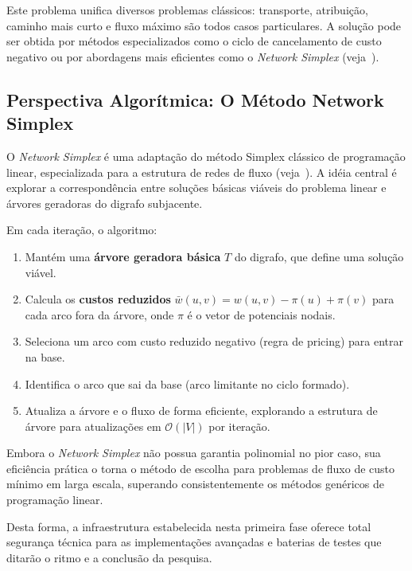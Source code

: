 \documentclass[12pt,a4paper]{article}
\begin{document}
Este problema unifica diversos problemas clássicos: transporte, atribuição, caminho mais curto e fluxo máximo são todos casos particulares. A solução pode ser obtida por métodos especializados como o ciclo de cancelamento de custo negativo ou por abordagens mais eficientes como o \textit{Network Simplex} (veja~\cite{dantzig1951application}).

\subsection{Perspectiva Algorítmica: O Método Network Simplex}

O \textit{Network Simplex} é uma adaptação do método Simplex clássico de programação linear, especializada para a estrutura de redes de fluxo (veja~\cite{ahuja1993network, dantzig1951application}). A idéia central é explorar a correspondência entre soluções básicas viáveis do problema linear e árvores geradoras do digrafo subjacente.

Em cada iteração, o algoritmo:
\begin{enumerate}
    \item Mantém uma \textbf{árvore geradora básica} $T$ do digrafo, que define uma solução viável.
    \item Calcula os \textbf{custos reduzidos} $\bar{w}(u,v) = w(u,v) - \pi(u) + \pi(v)$ para cada arco fora da árvore, onde $\pi$ é o vetor de potenciais nodais.
    \item Seleciona um arco com custo reduzido negativo (regra de pricing) para entrar na base.
    \item Identifica o arco que sai da base (arco limitante no ciclo formado).
    \item Atualiza a árvore e o fluxo de forma eficiente, explorando a estrutura de árvore para atualizações em $\mathcal{O}(|V|)$ por iteração.
\end{enumerate}

Embora o \textit{Network Simplex} não possua garantia polinomial no pior caso, sua eficiência prática o torna o método de escolha para problemas de fluxo de custo mínimo em larga escala, superando consistentemente os métodos genéricos de programação linear.

Desta forma, a infraestrutura estabelecida nesta primeira fase oferece total segurança técnica para as implementações avançadas e baterias de testes que ditarão o ritmo e a conclusão da pesquisa.

\newpage



\end{document}
